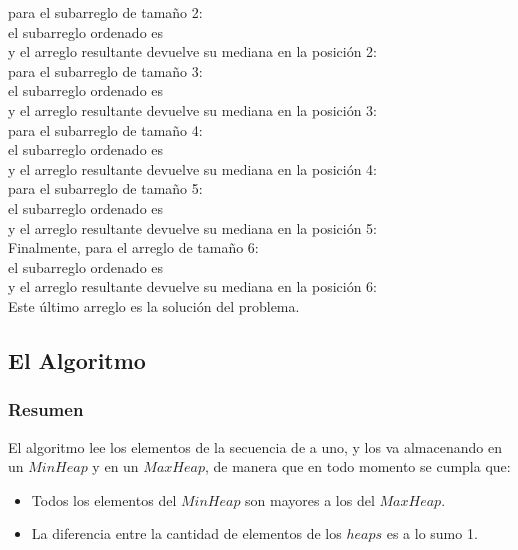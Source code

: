 \documentclass[spanish,a4paper]{article}
\begin{document}
para el subarreglo de tamaño 2:\\
el subarreglo ordenado es \\
y el arreglo resultante devuelve su mediana en la posición 2:\\

para el subarreglo de tamaño 3:\\
el subarreglo ordenado es \\
y el arreglo resultante devuelve su mediana en la posición 3:\\

para el subarreglo de tamaño 4:\\
el subarreglo ordenado es \\
y el arreglo resultante devuelve su mediana en la posición 4:\\

para el subarreglo de tamaño 5:\\
el subarreglo ordenado es \\
y el arreglo resultante devuelve su mediana en la posición 5:\\

Finalmente, para el arreglo de tamaño 6:\\
el subarreglo ordenado es \\
y el arreglo resultante devuelve su mediana en la posición 6:\\
Este último arreglo es la solución del problema.

\subsection{El Algoritmo}

\subsubsection{Resumen}
El algoritmo lee los elementos de la secuencia de a uno, y los va almacenando en un $MinHeap$ y en un $MaxHeap$, de manera que en todo momento se cumpla que:
\begin{itemize}
\item Todos los elementos del $MinHeap$ son mayores a los del $MaxHeap$.
\item La diferencia entre la cantidad de elementos de los $heaps$ es a lo sumo 1.
\end{itemize}
\end{document}
